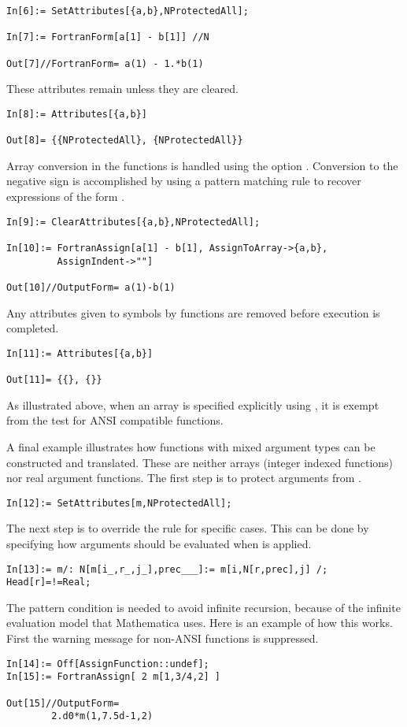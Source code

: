 \documentclass [12pt,twoside]{article}
\begin{document}
\begin{verbatim}
In[6]:= SetAttributes[{a,b},NProtectedAll];

In[7]:= FortranForm[a[1] - b[1]] //N

Out[7]//FortranForm= a(1) - 1.*b(1) 
\end{verbatim}
These attributes remain unless they are cleared.
\begin{verbatim}
In[8]:= Attributes[{a,b}]

Out[8]= {{NProtectedAll}, {NProtectedAll}}
\end{verbatim}
Array conversion in the  functions is handled using the
option . Conversion to the negative sign is accomplished
by using a pattern matching rule to recover expressions of the form
.
\begin{verbatim}
In[9]:= ClearAttributes[{a,b},NProtectedAll];

In[10]:= FortranAssign[a[1] - b[1], AssignToArray->{a,b},
         AssignIndent->""]

Out[10]//OutputForm= a(1)-b(1)
\end{verbatim}
Any attributes given to symbols by  functions are removed before
execution is completed.
\begin{verbatim}
In[11]:= Attributes[{a,b}]

Out[11]= {{}, {}}
\end{verbatim}
As illustrated above, when an array is specified explicitly using ,
it is exempt from the test for ANSI compatible functions.

A final example illustrates how functions with mixed argument types can be constructed and
translated. These are neither arrays (integer indexed functions) nor real argument functions.
The first step is to protect arguments from .
\begin{verbatim}
In[12]:= SetAttributes[m,NProtectedAll];
\end{verbatim}
The next step is to override the rule for specific cases. This can be done by specifying how
arguments should be evaluated when  is applied.
\begin{verbatim}
In[13]:= m/: N[m[i_,r_,j_],prec___]:= m[i,N[r,prec],j] /; Head[r]=!=Real;
\end{verbatim}
The pattern condition is needed to avoid infinite recursion, because of the infinite
evaluation model that Mathematica uses. Here is an example of how this works.
First the warning message for non-ANSI functions is suppressed.
\begin{verbatim}
In[14]:= Off[AssignFunction::undef];
In[15]:= FortranAssign[ 2 m[1,3/4,2] ]

Out[15]//OutputForm=
        2.d0*m(1,7.5d-1,2)
\end{verbatim}
\end{document}
